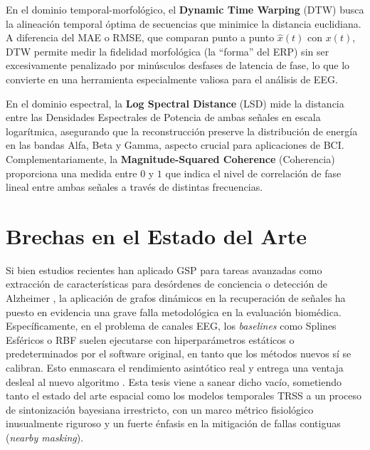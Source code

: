 En el dominio temporal-morfológico, el \textbf{Dynamic Time Warping} (DTW) busca la alineación temporal óptima de secuencias que minimice la distancia euclidiana. A diferencia del MAE o RMSE, que comparan punto a punto $\hat{x}(t)$ con $x(t)$, DTW permite medir la fidelidad morfológica (la ``forma'' del ERP) sin ser excesivamente penalizado por minúsculos desfases de latencia de fase, lo que lo convierte en una herramienta especialmente valiosa para el análisis de EEG.

En el dominio espectral, la \textbf{Log Spectral Distance} (LSD) mide la distancia entre las Densidades Espectrales de Potencia de ambas señales en escala logarítmica, asegurando que la reconstrucción preserve la distribución de energía en las bandas Alfa, Beta y Gamma, aspecto crucial para aplicaciones de BCI. Complementariamente, la \textbf{Magnitude-Squared Coherence} (Coherencia) proporciona una medida entre $0$ y $1$ que indica el nivel de correlación de fase lineal entre ambas señales a través de distintas frecuencias.

\section{Brechas en el Estado del Arte}

Si bien estudios recientes han aplicado GSP para tareas avanzadas como extracción de características para desórdenes de conciencia \cite{mortaheb_graph_2019} o detección de Alzheimer \cite{mootoo_detecting_2023}, la aplicación de grafos dinámicos en la recuperación de señales \cite{yan_signal_2026, krishnan_learning_2026} ha puesto en evidencia una grave falla metodológica en la evaluación biomédica. Específicamente, en el problema de canales EEG, los \textit{baselines} como Splines Esféricos o RBF suelen ejecutarse con hiperparámetros estáticos o predeterminados por el software original, en tanto que los métodos nuevos sí se calibran. Esto enmascara el rendimiento asintótico real y entrega una ventaja desleal al nuevo algoritmo \cite{calazans_machine_2024}. Esta tesis viene a sanear dicho vacío, sometiendo tanto el estado del arte espacial como los modelos temporales TRSS a un proceso de sintonización bayesiana irrestricto, con un marco métrico fisiológico inusualmente riguroso y un fuerte énfasis en la mitigación de fallas contiguas (\textit{nearby masking}).

